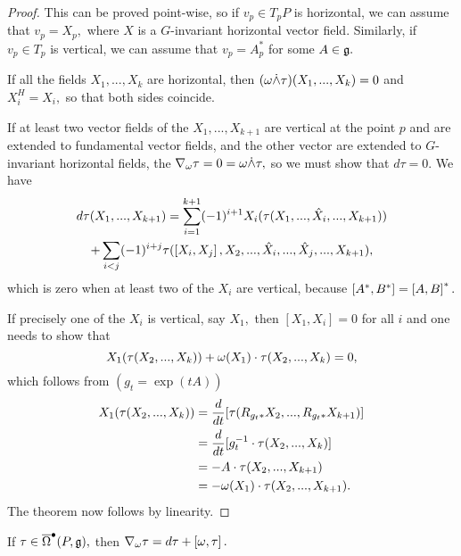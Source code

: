 \begin{proof}
 This can be proved point-wise, so if $v_{p}\in T_{p}P$ is horizontal, we can assume that $v_{p}=X_{p},$ where $X$ is a
$G$-invariant horizontal vector field. Similarly, if $v_{p} \in T_{p}$ is vertical, we can assume that
$v_{p}=A^{*}_{p}$ for some $A \in \mathfrak{g}.$

If all the fields $X_{1},...,X_{k}$ are horizontal, then $(\omega \dot{\wedge} \tau)(X_{1},...,X_{k})=0$ and $X_{i}^{H}=X_{i},$
so that both sides coincide.

If at least two vector fields of the $X_{1},...,X_{k+1}$ are vertical at the point $p$ and are extended to fundamental
vector fields, and the other vector are extended to $G$-invariant horizontal fields, the $\nabla_{\omega}\tau=0=\omega \dot{\wedge}
\tau,$ so we must show that $d\tau=0.$ We have
\begin{multline*}
 d\tau(X_{1},...,X_{k+1})= \sum_{i=1}^{k+1} (-1)^{i+1} X_{i}(\tau(X_{1},...,\hat{X}_{i},...,X_{k+1})) \\
+ \sum_{i<j} (-1)^{i+j} \tau(\left[X_{i},X_{j}\right],X_{2},..., \hat{X}_{i},...,\hat{X}_{j},...,X_{k+1}),
\end{multline*}
which is zero when at least two of the $X_{i}$ are vertical, because $\left[A^{*},B^{*}\right]=\left[A,B\right]^{*}.$

If precisely one of the $X_{i}$ is vertical, say $X_{1},$ then $[X_{1},X_{i}]=0$ for all $i$ and one needs to show that
$$
X_{1}(\tau(X_{2},...,X_{k}))+\omega(X_{1})\cdot \tau(X_{2},...,X_{k})=0,
$$
which follows from $(g_{t}=\exp(tA))$
\begin{align*}
 X_{1}(\tau(X_{2},...,X_{k})) &= \frac{d}{dt}[\tau(R_{g_{t}*}X_{2},...,R_{g_{t}*}X_{k+1})]\\
&=\frac{d}{dt}[g_{t}^{-1}\cdot\tau(X_{2},...,X_{k})] \\
&=-A\cdot \tau(X_{2},...,X_{k+1}) \\
&=-\omega(X_{1})\cdot \tau(X_{2},...,X_{k+1}).
\end{align*}
The theorem now follows by linearity.
\end{proof}


\begin{cor}
 If $\tau \in \overline{\Omega}^{\bullet}(P, \mathfrak{g}),$ then $\nabla_{\omega}\tau= d\tau + \left[\omega,\tau\right].$
\end{cor}

